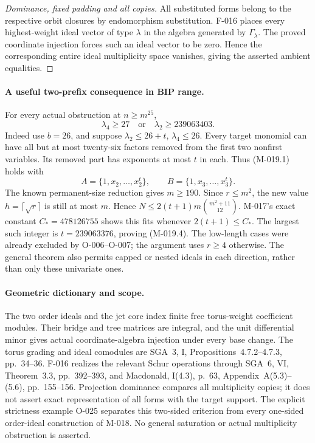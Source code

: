 \begin{proof}[Dominance, fixed padding and all copies]
All substituted forms belong to the respective orbit
closures by endomorphism substitution. F-016 places every
highest-weight ideal vector of type \(\lambda\) in the
algebra generated by \(\Gamma_\lambda\). The proved
coordinate injection forces such an ideal vector to be
zero. Hence the corresponding entire ideal multiplicity
space vanishes, giving the asserted ambient equalities.
\end{proof}

\paragraph{A useful two-prefix consequence in BIP range.}
For every actual obstruction at \(n\geq m^{25}\),
\[
                   \lambda_4\geq27
                       \quad\text{or}\quad\lambda_2\geq239063403.
                                                               \tag{M-019.4}
\]
Indeed use \(b=26\), and suppose
\(\lambda_2\leq26+t\), \(\lambda_4\leq26\).
Every target monomial can have all but at most twenty-six
factors removed from the first two nonfirst variables.
Its removed part has exponents at most \(t\) in each.
Thus (M-019.1) holds with
\[
             A=\{1,x_2,\ldots,x_2^t\},\qquad
             B=\{1,x_3,\ldots,x_3^t\}.
\]
The known permanent-size reduction gives \(m\geq190\).
Since \(r\leq m^2\), the new value
\(h=\lceil\sqrt r\rceil\) is still at most \(m\).
Hence \(N\leq2(t+1)m\binom{m^2+11}{12}\).
M-017's exact constant \(C_*=478126755\) shows this
fits whenever \(2(t+1)\leq C_*\).
The largest such integer is \(t=239063376\), proving
(M-019.4). The low-length cases were already excluded by
O-006--O-007; the argument uses \(r\geq4\) otherwise.
The general theorem also permits capped or nested ideals
in each direction, rather than only these univariate ones.

\paragraph{Geometric dictionary and scope.}
The two order ideals and the jet core index finite free
torus-weight coefficient modules. Their bridge and tree
matrices are integral, and the unit differential minor
gives actual coordinate-algebra injection under every
base change. The torus grading and ideal comodules are
SGA~3, I, Propositions~4.7.2--4.7.3, pp.~34--36.
F-016 realizes the relevant Schur operations through
SGA~6, VI, Theorem~3.3, pp.~392--393, and Macdonald,
I(4.3), p.~63, Appendix~A(5.3)--(5.6), pp.~155--156.
Projection dominance compares all multiplicity copies;
it does not assert exact representation of all forms with
the target support. The explicit strictness example O-025
separates this two-sided criterion from every one-sided
order-ideal construction of M-018. No general saturation
or actual multiplicity obstruction is asserted.
